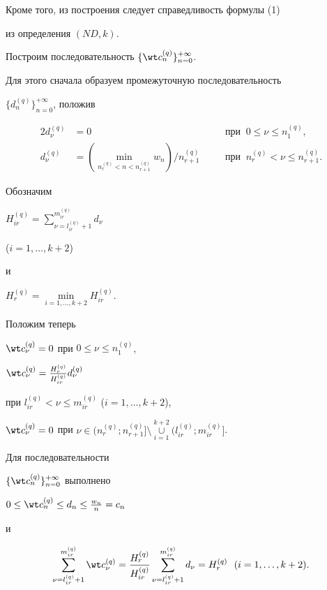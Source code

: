 Кроме того, из построения следует справедливость формулы (1) 


из определения $(ND, k)$.





Построим последовательность $\{\wt c{}_{n}^{(q)} \}_{n=0}^{+\infty}$.


Для этого сначала образуем промежуточную последовательность 


$\{d_{n}^{(q)} \}_{n=0}^{+\infty}$, положив


\begin{alignat*}{2}


d_{\nu}^{(q)}&=0 &\quad & \text{при }\ 0 \le \nu \le n_1^{(q)},\\


%


d_{\nu}^{(q)}&=(\min_{n_r^{(q)}<n<n_{r+1}^{(q)}} w_n) / n_{r+1}^{(q)} 


&\quad &\text{при } \ n_r^{(q)}< \nu \le n_{r+1}^{(q)}.


\end{alignat*}


Обозначим


$H_{ir}^{(q)}=\sum\limits_{\nu=l_{ir}^{(q)}+1}^{m_{ir}^{(q)}} d_{\nu}$ 


($i=1, \dotsc, k+2$)


и 


$H_{r}^{(q)}=\min\limits_{i=1,\dotsc, k+2} H_{ir}^{(q)}$.





Положим теперь


$\wt c{}_{\nu}^{(q)}=0$ при $0 \le \nu \le n_1^{(q)}$,


$\wt c{}_{\nu}^{(q)}=\frac{H_{r}^{(q)}}{H_{ir}^{(q)}} d_{\nu}^{(q)}$


при $l_{ir}^{(q)}<\nu \le m_{ir}^{(q)}$ ($i=1, \dotsc, k+2$),


$\wt c{}_{\nu}^{(q)}=0$ при $\nu \in 


(n_r^{(q)}; n_{r+1}^{(q)}] \setminus 


\mathop{\cup}\limits_{i=1}^{k+2} (l_{ir}^{(q)}; m_{ir}^{(q)}]$.


Для последовательности


$\{\wt c{}_{n}^{(q)} \}_{n=0}^{+\infty}$ выполнено


$0 \le \wt c{}_{n}^{(q)} \le d_n \le \frac{w_n}{n}=c_n$


и 


\begin{equation}


\sum_{\nu=l_{ir}^{(q)}+1}^{m_{ir}^{(q)}} \wt c{}_{\nu}^{(q)}= 


\frac{H_{r}^{(q)}}{H_{ir}^{(q)}} 


\sum_{\nu=l_{ir}^{(q)}+1}^{m_{ir}^{(q)}} d_{\nu}=H_r^{(q)}  


\ \ (i=1, \dotsc, k+2).


\end{equation}


